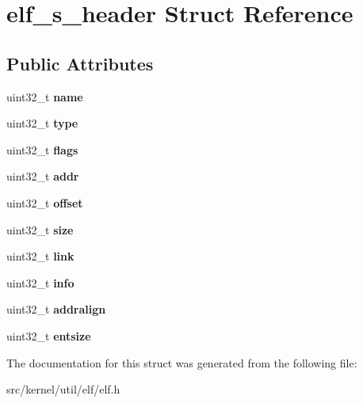 \hypertarget{structelf__s__header}{}\section{elf\+\_\+s\+\_\+header Struct Reference}
\label{structelf__s__header}
\subsection*{Public Attributes}
\begin{DoxyCompactItemize}
\item 
\mbox{\label{structelf__s__header_a3002d428badeff27179dcf7903329acd}} 
uint32\+\_\+t {\bfseries name}
\item 
\mbox{\label{structelf__s__header_a58818e69d29a0ed5eeb2cb5c70255918}} 
uint32\+\_\+t {\bfseries type}
\item 
\mbox{\label{structelf__s__header_a760b2e29da6ff43c21d4f7c05f4d1476}} 
uint32\+\_\+t {\bfseries flags}
\item 
\mbox{\label{structelf__s__header_a7fa5f2a7110cd647f6fcdbcdb213e40a}} 
uint32\+\_\+t {\bfseries addr}
\item 
\mbox{\label{structelf__s__header_a5510629c82b51e7b6e07913da4b8e9f0}} 
uint32\+\_\+t {\bfseries offset}
\item 
\mbox{\label{structelf__s__header_ab8b8a4048bc0eaf29ec953067a4841ca}} 
uint32\+\_\+t {\bfseries size}
\item 
\mbox{\label{structelf__s__header_a294f238d514f49657180ebd68f93b31f}} 
uint32\+\_\+t {\bfseries link}
\item 
\mbox{\label{structelf__s__header_a370d9a06883096d9175f7e710ab0f19a}} 
uint32\+\_\+t {\bfseries info}
\item 
\mbox{\label{structelf__s__header_a9196284f9d7ee977da8709cde0987aab}} 
uint32\+\_\+t {\bfseries addralign}
\item 
\mbox{\label{structelf__s__header_a00915512a13b62b470047e2ec51e5699}} 
uint32\+\_\+t {\bfseries entsize}
\end{DoxyCompactItemize}


The documentation for this struct was generated from the following file\+:\begin{DoxyCompactItemize}
\item 
src/kernel/util/elf/elf.\+h\end{DoxyCompactItemize}
